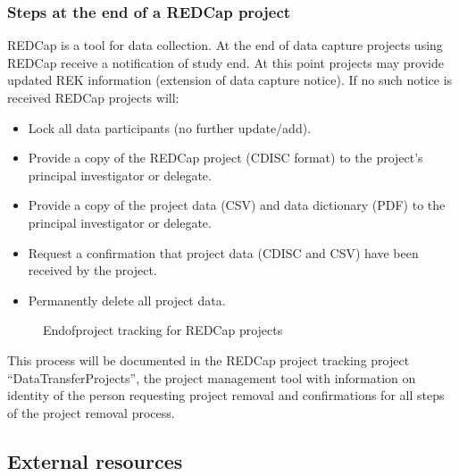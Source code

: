 \documentclass[letterpaper,10pt,english]{sphinxmanual}
\begin{document}
\subsubsection{Steps at the end of a REDCap project}
\label{\detokenize{EndUser/index:steps-at-the-end-of-a-redcap-project}}
\sphinxAtStartPar
REDCap is a tool for data collection. At the end of data capture projects using REDCap receive a notification of study end. At this point projects may provide updated REK information (extension of data capture notice). If no such notice is received REDCap projects will:
\begin{itemize}
\item {} 
\sphinxAtStartPar
Lock all data participants (no further update/add).

\item {} 
\sphinxAtStartPar
Provide a copy of the REDCap project (CDISC format) to the project’s principal investigator or delegate.

\item {} 
\sphinxAtStartPar
Provide a copy of the project data (CSV) and data dictionary (PDF) to the principal investigator or delegate.

\item {} 
\sphinxAtStartPar
Request a confirmation that project data (CDISC and CSV) have been received by the project.

\item {} 
\sphinxAtStartPar
Permanently delete all project data.

\end{itemize}

\begin{figure}[htbp]
\centering
\capstart

\noindent{}
\caption{End\sphinxhyphen{}of\sphinxhyphen{}project tracking for REDCap projects}\label{\detokenize{EndUser/index:id8}}\end{figure}

\sphinxAtStartPar
This process will be documented in the REDCap project tracking project “DataTransferProjects”, the project management tool with information on identity of the person requesting project removal and confirmations for all steps of the project removal process.


\subsection{External resources}
\label{\detokenize{EndUser/index:external-resources}}
\end{document}
